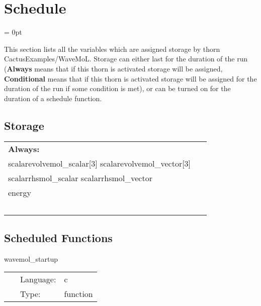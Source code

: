 
\section{Schedule} 


\parskip = 0pt


\noindent This section lists all the variables which are assigned storage by thorn CactusExamples/WaveMoL.  Storage can either last for the duration of the run ({\bf Always} means that if this thorn is activated storage will be assigned, {\bf Conditional} means that if this thorn is activated storage will be assigned for the duration of the run if some condition is met), or can be turned on for the duration of a schedule function.


\subsection*{Storage}

\hspace{5mm}

 \begin{tabular*}{160mm}{ll} 

{\bf Always:}&  ~ \\ 
 scalarevolvemol\_scalar[3] scalarevolvemol\_vector[3] & ~\\ 
 scalarrhsmol\_scalar scalarrhsmol\_vector & ~\\ 
 energy & ~\\ 
~ & ~\\ 
\end{tabular*} 


\subsection*{Scheduled Functions}
\vspace{5mm}


\hspace{5mm} wavemol\_startup 

\hspace{5mm}{\it register banner } 


\hspace{5mm}

 \begin{tabular*}{160mm}{cll} 
~ & Language:  & c \\ 
~ & Type:  & function \\ 
\end{tabular*} 


